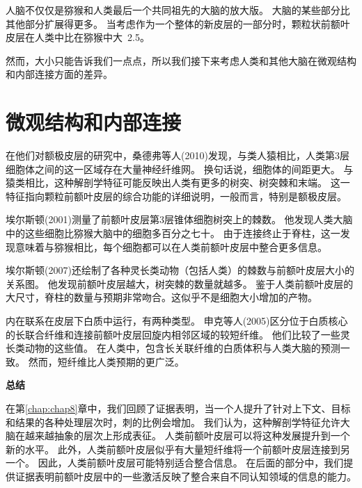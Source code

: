人脑不仅仅是猕猴和人类最后一个共同祖先的大脑的放大版。
大脑的某些部分比其他部分扩展得更多。
当考虑作为一个整体的新皮层的一部分时，颗粒状前额叶皮层在人类中比在猕猴中大~2.5。
\par


然而，大小只能告诉我们一点点，所以我们接下来考虑人类和其他大脑在微观结构和内部连接方面的差异。



\section{微观结构和内部连接}

在他们对额极皮层的研究中，桑德弗等人(2010)发现，与类人猿相比，人类第3层细胞体之间的这一区域存在大量神经纤维网。
换句话说，细胞体的间距更大。
与猿类相比，这种解剖学特征可能反映出人类有更多的树突、树突棘和末端。
这一特征指向颗粒前额叶皮层的综合功能的详细说明，一般而言，特别是额极皮层。
\par


埃尔斯顿(2001)测量了前额叶皮层第3层锥体细胞树突上的棘数。
他发现人类大脑中的这些细胞比猕猴大脑中的细胞多百分之七十。
由于连接终止于脊柱，这一发现意味着与猕猴相比，每个细胞都可以在人类前额叶皮层中整合更多信息。
\par


埃尔斯顿(2007)还绘制了各种灵长类动物（包括人类）的棘数与前额叶皮层大小的关系图。
他发现前额叶皮层越大，树突棘的数量就越多。
鉴于人类前额叶皮层的大尺寸，脊柱的数量与预期非常吻合。这似乎不是细胞大小增加的产物。
\par


内在联系在皮层下白质中运行，有两种类型。
申克等人(2005)区分位于白质核心的长联合纤维和连接前额叶皮层回旋内相邻区域的较短纤维。
他们比较了一些灵长类动物的这些值。
在人类中，包含长关联纤维的白质体积与人类大脑的预测一致。
然而，短纤维比人类预期的更广泛。
\par



\textbf{总结}
\par

在第\ref{chap:chap8}章中，我们回顾了证据表明，当一个人提升了针对上下文、目标和结果的各种处理层次时，刺的比例会增加。
我们认为，这种解剖学特征允许大脑在越来越抽象的层次上形成表征。
人类前额叶皮层可以将这种发展提升到一个新的水平。
此外，人类前额叶皮层似乎有大量短纤维将一个前额叶皮层连接到另一个。
因此，人类前额叶皮层可能特别适合整合信息。
在后面的部分中，我们提供证据表明前额叶皮层中的一些激活反映了整合来自不同认知领域的信息的能力。



